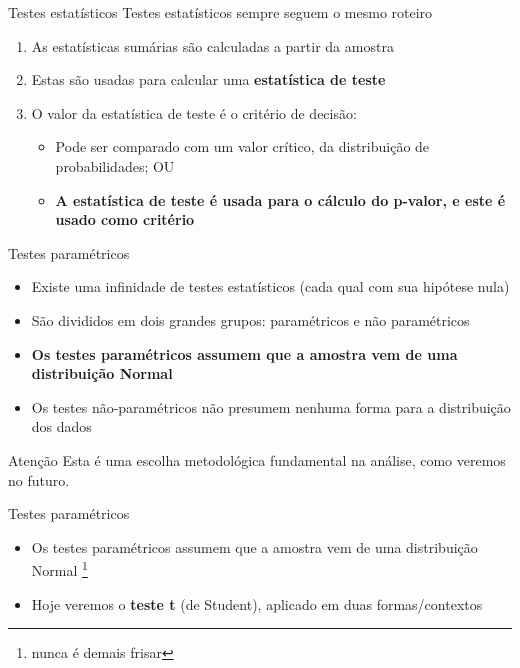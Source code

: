 \documentclass{beamer}
\begin{document}
\begin{frame}{Testes estatísticos}
Testes estatísticos sempre seguem o mesmo roteiro
  \begin{enumerate}
  \item As estatísticas sumárias são calculadas a partir da amostra
  \item Estas são usadas para calcular uma {\bf estatística de teste}
  \item O valor da estatística de teste é o critério de decisão:
    \begin{itemize}
    \item Pode ser comparado com um valor crítico, da distribuição de probabilidades; OU
    \item {\bf A estatística de teste é usada para o cálculo do p-valor, e este é usado como critério}
    \end{itemize}
  \end{enumerate}
\end{frame}

\begin{frame}{Testes paramétricos}
  \begin{itemize}
  \item Existe uma infinidade de testes estatísticos (cada qual com sua hipótese nula)
  \item São divididos em dois grandes grupos: paramétricos e não paramétricos
  \item {\bf Os testes paramétricos assumem que a amostra vem de uma \alert{distribuição Normal}}
  \item Os testes não-paramétricos não presumem nenhuma forma para a distribuição dos dados
  \end{itemize}
  \begin{block}{Atenção}
    Esta é uma escolha metodológica fundamental na análise, como veremos no futuro.
  \end{block}
\end{frame}

\begin{frame}{Testes paramétricos}
  \begin{itemize}
  \item Os testes paramétricos assumem que a amostra vem de uma \alert{distribuição Normal} \footnote{nunca é demais frisar}
  \item Hoje veremos o {\bf teste t} (de Student), aplicado em duas formas/contextos
  \end{itemize}
\end{frame}
\end{document}
